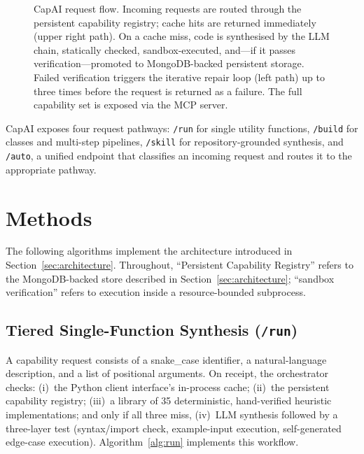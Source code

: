 \documentclass[conference]{IEEEtran}
\begin{document}
\begin{figure}[htbp]
\begin{tikzpicture}
\end{tikzpicture}
\caption{CapAI request flow. Incoming requests are routed through the
persistent capability registry; cache hits are returned immediately
(upper right path). On a cache miss, code is synthesised by the LLM
chain, statically checked, sandbox-executed, and---if it passes
verification---promoted to MongoDB-backed persistent storage. Failed
verification triggers the iterative repair loop (left path) up to three
times before the request is returned as a failure. The full capability
set is exposed via the MCP server.}
\label{fig:arch}
\end{figure}

CapAI exposes four request pathways: \texttt{/run} for single utility
functions, \texttt{/build} for classes and multi-step pipelines,
\texttt{/skill} for repository-grounded synthesis, and \texttt{/auto}, a
unified endpoint that classifies an incoming request and routes it to the
appropriate pathway.

\section{Methods}
\label{sec:methods}

The following algorithms implement the architecture introduced in
Section~\ref{sec:architecture}.
Throughout, ``Persistent Capability Registry'' refers to the MongoDB-backed
store described in Section~\ref{sec:architecture}; ``sandbox verification''
refers to execution inside a resource-bounded subprocess.

\subsection{Tiered Single-Function Synthesis (\texttt{/run})}
\label{subsec:run}

A capability request consists of a snake\_case identifier, a
natural-language description, and a list of positional arguments.
On receipt, the orchestrator checks: (i)~the Python client interface's
in-process cache; (ii)~the persistent capability registry; (iii)~a
library of 35 deterministic, hand-verified heuristic implementations; and
only if all three miss, (iv)~LLM synthesis followed by a three-layer test
(syntax/import check, example-input execution, self-generated edge-case
execution).
Algorithm~\ref{alg:run} implements this workflow.
\end{document}

